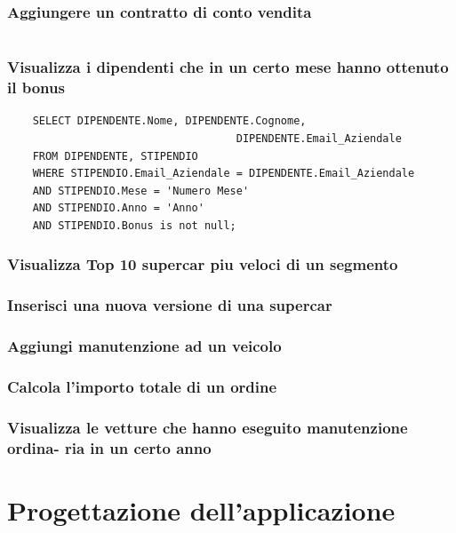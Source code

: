 \documentclass[12pt]{article}
\begin{document}
\subsubsection*{Aggiungere un contratto di conto vendita}
\begin{lstlisting}

\end{lstlisting}

\subsubsection*{Visualizza i dipendenti che in un certo mese hanno ottenuto il
bonus}

\begin{lstlisting}
    SELECT DIPENDENTE.Nome, DIPENDENTE.Cognome, 
                                    DIPENDENTE.Email_Aziendale 
    FROM DIPENDENTE, STIPENDIO
    WHERE STIPENDIO.Email_Aziendale = DIPENDENTE.Email_Aziendale
    AND STIPENDIO.Mese = 'Numero Mese'
    AND STIPENDIO.Anno = 'Anno'
    AND STIPENDIO.Bonus is not null;
\end{lstlisting}

\subsubsection*{Visualizza Top 10 supercar piu veloci di un segmento}

\subsubsection*{Inserisci una nuova versione di una supercar}

\subsubsection*{Aggiungi manutenzione ad un veicolo}

\subsubsection*{Calcola l’importo totale di un ordine}

\subsubsection*{Visualizza le vetture che hanno eseguito manutenzione ordina-
ria in un certo anno}

\section{Progettazione dell'applicazione}
\end{document}
